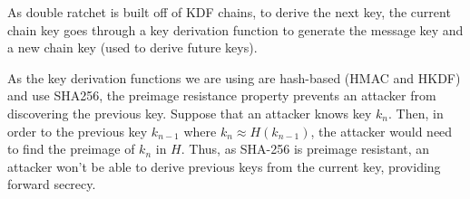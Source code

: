 As double ratchet is built off of KDF chains, to derive the next key, the current chain key goes through 
a key derivation function to generate the message key and a new chain key (used to derive future keys).

As the key derivation functions we are using are hash-based (HMAC and HKDF) and use SHA256, the preimage 
resistance property prevents an attacker from discovering the previous key. Suppose that an attacker knows 
key $k_n$. Then, in order to the previous key $k_{n-1}$ where $k_n\approx H(k_{n-1})$, the attacker would need to find 
the preimage of $k_n$ in $H$. Thus, as SHA-256 is preimage resistant, an attacker won't be able to derive previous 
keys from the current key, providing forward secrecy.
